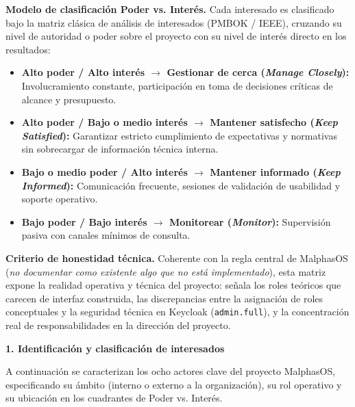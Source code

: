 \documentclass[12pt,varwidth=170mm,border=10pt]{standalone}
\newcommand{\sectiontitle}[1]{%
  \par\vspace{1.8ex}%
  {\normalfont\Large\bfseries #1\par}%
  \vspace{1.0ex}%
}
\newcommand{\ruta}[1]{\nolinkurl{#1}}
\begin{document}
\textbf{Modelo de clasificación Poder vs. Interés.} Cada interesado es clasificado bajo la matriz clásica de análisis de interesados (PMBOK / IEEE), cruzando su nivel de autoridad o poder sobre el proyecto con su nivel de interés directo en los resultados:
\begin{itemize}
  \item \textbf{Alto poder / Alto interés $\to$ Gestionar de cerca (\emph{Manage Closely}):} Involucramiento constante, participación en toma de decisiones críticas de alcance y presupuesto.
  \item \textbf{Alto poder / Bajo o medio interés $\to$ Mantener satisfecho (\emph{Keep Satisfied}):} Garantizar estricto cumplimiento de expectativas y normativas sin sobrecargar de información técnica interna.
  \item \textbf{Bajo o medio poder / Alto interés $\to$ Mantener informado (\emph{Keep Informed}):} Comunicación frecuente, sesiones de validación de usabilidad y soporte operativo.
  \item \textbf{Bajo poder / Bajo interés $\to$ Monitorear (\emph{Monitor}):} Supervisión pasiva con canales mínimos de consulta.
\end{itemize}

\textbf{Criterio de honestidad técnica.} Coherente con la regla central de MalphasOS (\emph{no documentar como existente algo que no está implementado}), esta matriz expone la realidad operativa y técnica del proyecto: señala los roles teóricos que carecen de interfaz construida, las discrepancias entre la asignación de roles conceptuales y la seguridad técnica en Keycloak (\ruta{admin.full}), y la concentración real de responsabilidades en la dirección del proyecto.

\sectiontitle{1. Identificación y clasificación de interesados}

A continuación se caracterizan los ocho actores clave del proyecto MalphasOS, especificando su ámbito (interno o externo a la organización), su rol operativo y su ubicación en los cuadrantes de Poder vs. Interés.
\end{document}
